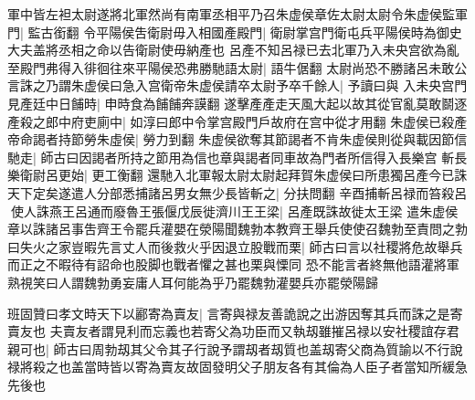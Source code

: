 軍中皆左袒太尉遂將北軍然尚有南軍丞相平乃召朱虚侯章佐太尉太尉令朱虚侯監軍門|{
	監古銜翻}
令平陽侯吿衛尉毋入相國產殿門|{
	衛尉掌宫門衛屯兵平陽侯時為御史大夫盖將丞相之命以告衛尉使毋納產也}
呂產不知呂禄已去北軍乃入未央宫欲為亂至殿門弗得入徘徊往來平陽侯恐弗勝馳語太尉|{
	語牛倨翻}
太尉尚恐不勝諸呂未敢公言誅之乃謂朱虚侯曰急入宫衛帝朱虚侯請卒太尉予卒千餘人|{
	予讀曰與}
入未央宫門見產廷中日餔時|{
	申時食為餔餔奔謨翻}
遂擊產產走天風大起以故其從官亂莫敢鬬逐產殺之郎中府吏廁中|{
	如淳曰郎中令掌宫殿門戶故府在宫中從才用翻}
朱虚侯已殺產帝命謁者持節勞朱虛侯|{
	勞力到翻}
朱虚侯欲奪其節謁者不肯朱虚侯則從與載因節信馳走|{
	師古曰因謁者所持之節用為信也章與謁者同車故為門者所信得入長樂宫}
斬長樂衛尉呂更始|{
	更工衡翻}
還馳入北軍報太尉太尉起拜賀朱虚侯曰所患獨呂產今已誅天下定矣遂遣人分部悉捕諸呂男女無少長皆斬之|{
	分扶問翻}
辛酉捕斬呂禄而笞殺呂使人誅燕王呂通而廢魯王張偃戊辰徙濟川王王梁|{
	呂產既誅故徙太王梁}
遣朱虚侯章以誅諸呂事吿齊王令罷兵灌嬰在滎陽聞魏勃本教齊王舉兵使使召魏勃至責問之勃曰失火之家豈暇先言丈人而後救火乎因退立股戰而栗|{
	師古曰言以社稷將危故舉兵而正之不暇待有詔命也股脚也戰者懼之甚也栗與慄同}
恐不能言者終無他語灌將軍熟視笑曰人謂魏勃勇妄庸人耳何能為乎乃罷魏勃灌嬰兵亦罷滎陽歸

班固贊曰孝文時天下以酈寄為賣友|{
	言寄與禄友善詭說之出游因奪其兵而誅之是寄賣友也}
夫賣友者謂見利而忘義也若寄父為功臣而又執刼雖摧呂禄以安社稷誼存君親可也|{
	師古曰周勃刼其父令其子行說予謂刼者刼質也盖刼寄父商為質諭以不行說禄將殺之也盖當時皆以寄為賣友故固發明父子朋友各有其倫為人臣子者當知所緩急先後也}


